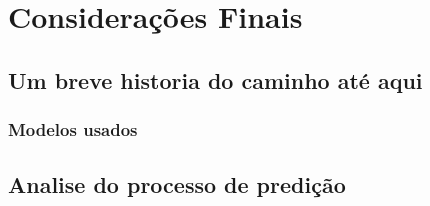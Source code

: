 \chapter{Considerações Finais}

\section{Um breve historia do caminho até aqui}

\subsection{Modelos usados}

\section{Analise do processo de predição}